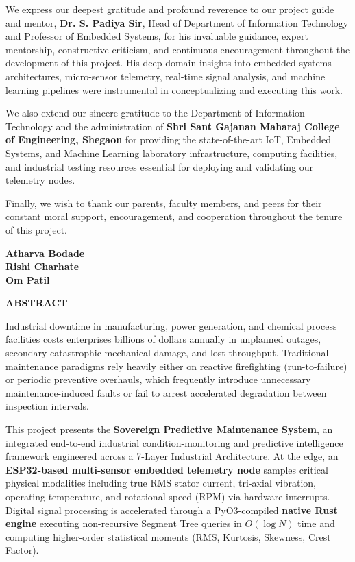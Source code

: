 \documentclass[12pt,a4paper,oneside]{report}
\begin{document}
\noindent We express our deepest gratitude and profound reverence to our project guide and mentor, \textbf{Dr. S. Padiya Sir}, Head of Department of Information Technology and Professor of Embedded Systems, for his invaluable guidance, expert mentorship, constructive criticism, and continuous encouragement throughout the development of this project. His deep domain insights into embedded systems architectures, micro-sensor telemetry, real-time signal analysis, and machine learning pipelines were instrumental in conceptualizing and executing this work.

\noindent We also extend our sincere gratitude to the Department of Information Technology and the administration of \textbf{Shri Sant Gajanan Maharaj College of Engineering, Shegaon} for providing the state-of-the-art IoT, Embedded Systems, and Machine Learning laboratory infrastructure, computing facilities, and industrial testing resources essential for deploying and validating our telemetry nodes.

\noindent Finally, we wish to thank our parents, faculty members, and peers for their constant moral support, encouragement, and cooperation throughout the tenure of this project.

\vspace{15mm}
\begin{flushright}
    \textbf{Atharva Bodade}\\
    \textbf{Rishi Charhate}\\
    \textbf{Om Patil}
\end{flushright}

\newpage
\thispagestyle{plain}
\begin{center}
    {\Large \textbf{ABSTRACT}}\\[8mm]
\end{center}

Industrial downtime in manufacturing, power generation, and chemical process facilities costs enterprises billions of dollars annually in unplanned outages, secondary catastrophic mechanical damage, and lost throughput. Traditional maintenance paradigms rely heavily either on reactive firefighting (run-to-failure) or periodic preventive overhauls, which frequently introduce unnecessary maintenance-induced faults or fail to arrest accelerated degradation between inspection intervals.

This project presents the \textbf{Sovereign Predictive Maintenance System}, an integrated end-to-end industrial condition-monitoring and predictive intelligence framework engineered across a 7-Layer Industrial Architecture. At the edge, an \textbf{ESP32-based multi-sensor embedded telemetry node} samples critical physical modalities including true RMS stator current, tri-axial vibration, operating temperature, and rotational speed (RPM) via hardware interrupts. Digital signal processing is accelerated through a PyO3-compiled \textbf{native Rust engine} executing non-recursive Segment Tree queries in $O(\log N)$ time and computing higher-order statistical moments (RMS, Kurtosis, Skewness, Crest Factor).
\end{document}
